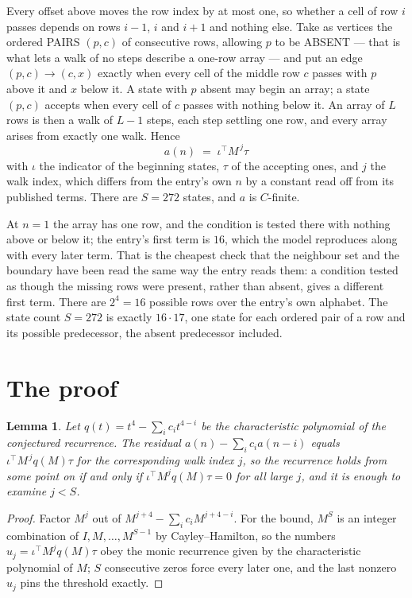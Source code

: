 \documentclass[11pt,a4paper]{article}
\theoremstyle{plain}
\newtheorem{lemma}[theorem]{Lemma}
\theoremstyle{definition}
\begin{document}
Every offset above moves the row index by at most one, so whether a cell of row $i$ passes
depends on rows $i-1$, $i$ and $i+1$ and nothing else. Take as vertices the ordered PAIRS
$(p,c)$ of consecutive rows, allowing $p$ to be ABSENT --- that is what lets a walk of no steps
describe a one-row array --- and put an edge $(p,c)\to(c,x)$ exactly when every cell of the
middle row $c$ passes with $p$ above it and $x$ below it. A state with $p$ absent may begin an
array; a state $(p,c)$ accepts when every cell of $c$ passes with nothing below it. An array of
$L$ rows is then a walk of $L-1$ steps, each step settling one row, and every array arises from
exactly one walk. Hence
\[
a(n)\;=\;\iota^{\!\top}M^{\,j}\tau
\]
with $\iota$ the indicator of the beginning states, $\tau$ of the accepting ones, and $j$ the
walk index, which differs from the entry's own $n$ by a constant read off from its published
terms. There are $S=272$ states, and $a$ is $C$-finite.

At $n=1$ the array has one row, and
the condition is tested there with nothing above or below it; the entry's first term is
$16$, which the model reproduces along with every later term. That is the cheapest check
that the neighbour set and the boundary have been read the same way the entry reads them: a
condition tested as though the missing rows were present, rather than absent, gives a different
first term. There are $2^{4}=16$ possible rows over the entry's own alphabet. The state count $S=272$ is exactly $16\cdot17$,
one state for each ordered pair of a row and its possible predecessor, the absent predecessor
included.

\section{The proof}

\begin{lemma}\label{lem:crit}
Let $q(t)=t^{4}-\sum_i c_it^{4-i}$ be the characteristic polynomial of the
conjectured recurrence. The residual $a(n)-\sum_ic_ia(n-i)$ equals
$\iota^{\!\top}M^{\,j}q(M)\tau$ for the corresponding walk index $j$, so the recurrence
holds from some point on if and only if $\iota^{\!\top}M^{j}q(M)\tau=0$ for all large $j$,
and it is enough to examine $j<S$.
\end{lemma}

\begin{proof}
Factor $M^{j}$ out of $M^{j+4}-\sum_ic_iM^{j+4-i}$. For the bound, $M^{S}$
is an integer combination of $I,M,\dots,M^{S-1}$ by Cayley--Hamilton, so the numbers
$u_j=\iota^{\!\top}M^{j}q(M)\tau$ obey the monic recurrence given by the characteristic
polynomial of $M$; $S$ consecutive zeros force every later one, and the last nonzero $u_j$
pins the threshold exactly.
\end{proof}
\end{document}
